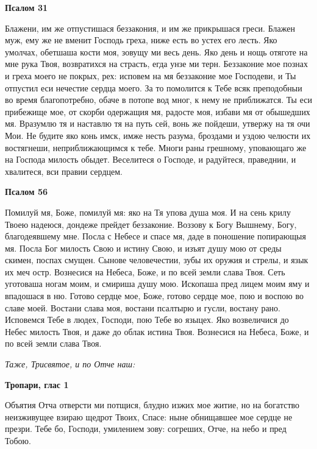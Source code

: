 \bfseries Псалом 31\normalfont{}


Блажени, им же отпустишася беззакония, и им же прикрышася греси. Блажен муж, ему же не вменит Господь греха, ниже есть во устех его лесть. Яко умолчах, обетшаша кости моя, зовущу ми весь день. Яко день и нощь отяготе на мне рука Твоя, возвратихся на страсть, егда унзе ми терн. Беззаконие мое познах и греха моего не покрых, рех: исповем на мя беззаконие мое Господеви, и Ты отпустил еси нечестие сердца моего. За то помолится к Тебе всяк преподобныи во время благопотребно, обаче в потопе вод мног, к нему не приближатся. Ты еси прибежище мое, от скорби одержащия мя, радосте моя, избави мя от обышедших мя. Вразумлю тя и наставлю тя на путь сей, вонь же пойдеши, утвержу на тя очи Мои. Не будите яко конь имск, имже несть разума, броздами и уздою челюсти их востягнеши, неприближающимся к тебе. Многи раны грешному, уповающаго же на Господа милость обыдет. Веселитеся о Господе, и радуйтеся, праведнии, и хвалитеся, вси правии сердцем.





\bfseries Псалом 56\normalfont{}


Помилуй мя, Боже, помилуй мя: яко на Тя упова душа моя. И на сень крилу Твоею надеюся, дондеже прейдет беззаконие. Воззову к Богу Вышнему, Богу, благодеявшему мне. Посла с Небесе и спасе мя, даде в поношение попирающыя мя. Посла Бог милость Свою и истину Свою, и изъят душу мою от среды скимен, поспах смущен. Сынове человечестии, зубы их оружия и стрелы, и язык их меч остр. Вознесися на Небеса, Боже, и по всей земли слава Твоя. Сеть уготоваша ногам моим, и смириша душу мою. Ископаша пред лицем моим яму и впадошася в ню. Готово сердце мое, Боже, готово сердце мое, пою и воспою во славе моей. Востани слава моя, востани псалтырю и гусли, востану рано. Исповемся Тебе в людех, Господи, пою Тебе во языцех. Яко возвеличися до Небес милость Твоя, и даже до облак истина Твоя. Вознесися на Небеса, Боже, и по всей земли слава Твоя.


\itshape Таже, Трисвятое, и по Отче наш:\normalfont{}





\bfseries Тропари, глас 1\normalfont{}


Объятия Отча отверсти ми потщися, блудно изжих мое житие, но на богатство неизживущее взираю щедрот Твоих, Спасе: ныне обнищавшее мое сердце не презри. Тебе бо, Господи, умилением зову: согреших, Отче, на небо и пред Тобою.


